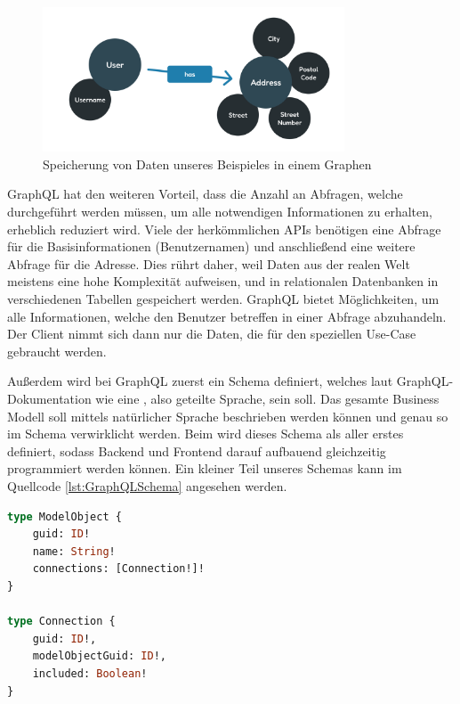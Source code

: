 \begin{figure}
    \centering
    \includegraphics[width=0.8\textwidth]{content/img/Empire/Frontend/GraphQL_Example_User_Address.png}
    \caption{Speicherung von Daten unseres Beispieles in einem Graphen}
    \label{fig:GraphExampleUserAddress}
\end{figure}
\FloatBarrier

GraphQL hat den weiteren Vorteil, dass die Anzahl an Abfragen, welche durchgeführt werden müssen, um alle notwendigen Informationen zu erhalten, erheblich reduziert wird. Viele der herkömmlichen APIs benötigen eine Abfrage für die Basisinformationen (Benutzernamen) und anschließend eine weitere Abfrage für die Adresse. Dies rührt daher, weil Daten aus der realen Welt meistens eine hohe Komplexität aufweisen, und in relationalen Datenbanken in verschiedenen Tabellen gespeichert werden. GraphQL bietet Möglichkeiten, um alle Informationen, welche den Benutzer betreffen in einer Abfrage abzuhandeln. Der Client nimmt sich dann nur die Daten, die für den speziellen Use-Case gebraucht werden. \cite{FireshipGraphQL}

Außerdem wird bei GraphQL zuerst ein Schema definiert, welches laut GraphQL-Dokumentation wie eine , also geteilte Sprache, sein soll. Das gesamte Business Modell soll mittels natürlicher Sprache beschrieben werden können und genau so im Schema verwirklicht werden. Beim  wird dieses Schema als aller erstes definiert, sodass Backend und Frontend darauf aufbauend gleichzeitig programmiert werden können. Ein kleiner Teil unseres Schemas kann im Quellcode \ref{lst:GraphQLSchema} angesehen werden. \cite{GraphQLThinkingInGraphs}

\begin{lstlisting}[language={graphql},caption={Teil unseres GraphQL Schemas},label={lst:GraphQLSchema},captionpos=b]
type ModelObject {
    guid: ID!
    name: String!
    connections: [Connection!]!
}

type Connection {
    guid: ID!,
    modelObjectGuid: ID!,
    included: Boolean!
}
\end{lstlisting}

